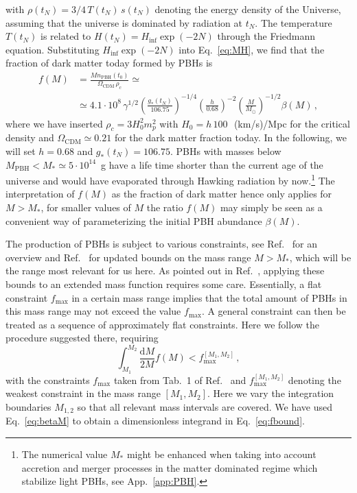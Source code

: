 with $\rho(t_N) = 3/4 \, T(t_N) \, s(t_N)$ denoting the energy density of the Universe, assuming that the universe is dominated by radiation at $t_N$. The temperature $T(t_N)$ is related to $H(t_N) = H_\text{inf} \exp(- 2 N)$ through the Friedmann equation. Substituting $H_\text{inf} \exp(- 2 N)$ into Eq.~\eqref{eq:MH}, we find that the fraction of dark matter today formed by PBHs is
\begin{align}
f(M)  & = \frac{M n_\text{PBH}(t_0) }{\Omega_\text{CDM} \, \rho_c} \simeq \nonumber \\ 
& \simeq 4.1 \cdot 10^8 \, \gamma^{1/2} \left( \frac{g_{*}(t_N)}{106.75}\right)^{-1/4} \left( \frac{h}{0.68}\right)^{-2} \left( \frac{M}{M_\odot} \right)^{-1/2} \beta(M)\,,
\label{eq:f}
\end{align}
where we have inserted $\rho_c = 3 H_0^2 m_p^2$ with $H_0 = h \, 100 \,$~(km/s)/Mpc for the critical density and $\Omega_\text{CDM} \simeq 0.21$ for the dark matter fraction today. In the following, we will set $h = 0.68$ and $g_*(t_N) = 106.75$. PBHs with masses below $M_\text{PBH} < M_* \simeq 5 \cdot 10^{14}$~g have a life time shorter than the current age of the universe and would have evaporated through Hawking radiation by now.\footnote{The numerical value $M_*$ might be enhanced when taking into account accretion and merger processes in the matter dominated regime which stabilize light PBHs, see App.~\ref{app:PBH}.} The interpretation of $f(M)$ as the fraction of dark matter hence only applies for $M > M_*$, for smaller values of $M$ the ratio $f(M)$ may simply be seen as a convenient way of parameterizing the initial PBH abundance $\beta(M)$.

The production of PBHs is subject to various constraints, see Ref.~\cite{Carr:2009jm} for an overview and Ref.~\cite{Carr:2016drx} for updated bounds on the mass range $M > M_*$, which will be the range most relevant for us here. As pointed out in Ref.~\cite{Carr:2016drx}, applying these bounds to an extended mass function requires some care. Essentially, a flat constraint $f_\text{max}$ in a certain mass range implies that the total amount of PBHs in this mass range may not exceed the value $f_\text{max}$. A general constraint can then be treated as a sequence of approximately flat constraints. Here we follow the procedure suggested there, requiring
\begin{equation}
\int_{M_1}^{M_2} \frac{\textrm{d}M}{2 M} f(M) < f_\text{max}^{[M_1,M_2]} \,,
\label{eq:fbound}
\end{equation}
with the constraints $f_\text{max}$ taken from Tab.~1 of Ref.~\cite{Carr:2016drx} and $f_\text{max}^{[M_1,M_2]}$ denoting the weakest constraint in the mass range $[M_1,M_2]$. Here we vary the integration boundaries $M_{1,2}$ so that all relevant mass intervals are covered. We have used Eq.~\eqref{eq:betaM} to obtain a dimensionless integrand in Eq.~\eqref{eq:fbound}. 

